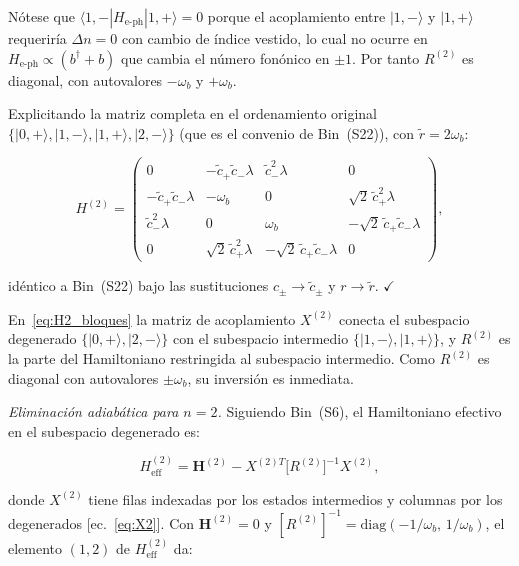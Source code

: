 \documentclass[12pt]{article}
\begin{document}
\noindent
Nótese que $\langle 1,{-}|H_\mathrm{e\text{-}ph}|1,{+}\rangle = 0$
porque el acoplamiento entre $|1,{-}\rangle$ y $|1,{+}\rangle$
requeriría $\Delta n = 0$ con cambio de índice vestido, lo cual
no ocurre en $H_\mathrm{e\text{-}ph} \propto (b^\dagger + b)$ que
cambia el número fonónico en $\pm 1$. Por tanto $R^{(2)}$ es
diagonal, con autovalores $-\omega_b$ y $+\omega_b$.

\medskip
\noindent
Explicitando la matriz completa en el ordenamiento original
$\{|0,{+}\rangle, |1,{-}\rangle, |1,{+}\rangle, |2,{-}\rangle\}$
(que es el convenio de Bin~(S22)), con $\tilde{r} = 2\omega_b$:

\begin{equation}
	H^{(2)} = \begin{pmatrix}
		0
		& -\tilde{c}_+\tilde{c}_-\lambda
		& \tilde{c}_-^2\lambda
		& 0 \\[6pt]
		-\tilde{c}_+\tilde{c}_-\lambda
		& -\omega_b
		& 0
		& \sqrt{2}\,\tilde{c}_+^2\lambda \\[6pt]
		\tilde{c}_-^2\lambda
		& 0
		& \omega_b
		& -\sqrt{2}\,\tilde{c}_+\tilde{c}_-\lambda \\[6pt]
		0
		& \sqrt{2}\,\tilde{c}_+^2\lambda
		& -\sqrt{2}\,\tilde{c}_+\tilde{c}_-\lambda
		& 0
	\end{pmatrix},
	\label{eq:H2_full}
\end{equation}

\noindent
idéntico a Bin~(S22) bajo las sustituciones $c_\pm \to \tilde{c}_\pm$
y $r \to \tilde{r}$. $\checkmark$

\medskip
\noindent
En~\eqref{eq:H2_bloques} la matriz de acoplamiento $X^{(2)}$
conecta el subespacio degenerado $\{|0,{+}\rangle, |2,{-}\rangle\}$
con el subespacio intermedio $\{|1,{-}\rangle, |1,{+}\rangle\}$,
y $R^{(2)}$ es la parte del Hamiltoniano restringida al subespacio
intermedio. Como $R^{(2)}$ es diagonal con autovalores $\pm\omega_b$,
su inversión es inmediata.

\medskip
\noindent
\textit{Eliminación adiabática para $n=2$.}
Siguiendo Bin~(S6), el Hamiltoniano efectivo en el subespacio
degenerado es:

\begin{equation}
	H_\mathrm{eff}^{(2)} = \mathbf{H}^{(2)} - X^{(2)T}\bigl[R^{(2)}\bigr]^{-1}X^{(2)},
	\label{eq:Heff_formula}
\end{equation}

\noindent
donde $X^{(2)}$ tiene filas indexadas por los estados intermedios
y columnas por los degenerados [ec.~\eqref{eq:X2}]. Con
$\mathbf{H}^{(2)} = 0$ y $[R^{(2)}]^{-1} = \mathrm{diag}(-1/\omega_b,\, 1/\omega_b)$,
el elemento $(1,2)$ de $H_\mathrm{eff}^{(2)}$ da:
\end{document}
